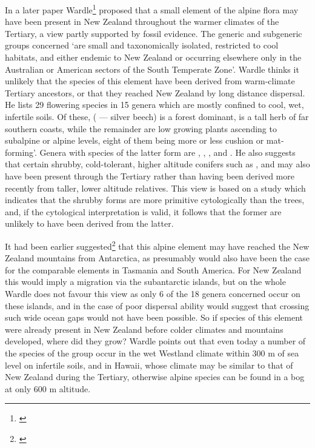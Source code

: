 In a later paper Wardle\footnote{\cite{wardle1968evidence}} proposed that a small element of the alpine flora may have been present in New Zealand throughout the warmer climates of the Tertiary, a view partly supported by fossil evidence.
The generic and subgeneric groups concerned `are small and taxonomically isolated, restricted to cool habitats, and either endemic to New Zealand or occurring elsewhere only in the Australian or American sectors of the South Temperate Zone'.
Wardle thinks it unlikely that the species of this element have been derived from warm-climate Tertiary ancestors, or that they reached New Zealand by long distance dispersal.
He lists 29 flowering species in 15 genera which are mostly confined to cool, wet, infertile soils.
Of these,  ( — silver beech) is a forest dominant,  is a tall herb of far southern coasts, while the remainder are low growing plants ascending to subalpine or alpine levels, eight of them being more or less cushion or mat-forming'.
Genera with species of the latter form are , , ,  and .
He also suggests that certain shrubby, cold-tolerant, higher altitude conifers such as ,  and  may also have been present through the Tertiary rather than having been derived more recently from taller, lower altitude relatives.
This view is based on a study which indicates that the shrubby forms are more primitive cytologically than the trees, and, if the cytological interpretation is valid, it follows that the former are unlikely to have been derived from the latter.

It had been earlier suggested\footnote{\cite{fleming1963age}} that this alpine element may have reached the New Zealand mountains from Antarctica, as presumably would also have been the case for the comparable elements in Tasmania and South America.
For New Zealand this would imply a migration via the subantarctic islands, but on the whole Wardle does not favour this view as only 6 of the 18 genera concerned occur on these islands, and in the case of  poor dispersal ability would suggest that crossing such wide ocean gaps would not have been possible.
So if species of this element were already present in New Zealand before colder climates and mountains developed, where did they grow? Wardle points out that even today a number of the species of the group occur in the wet Westland climate within 300 m of sea level on infertile soils, and in Hawai{\okina}i, whose climate may be similar to that of New Zealand during the Tertiary, otherwise alpine species can be found in a bog at only 600 m altitude.

